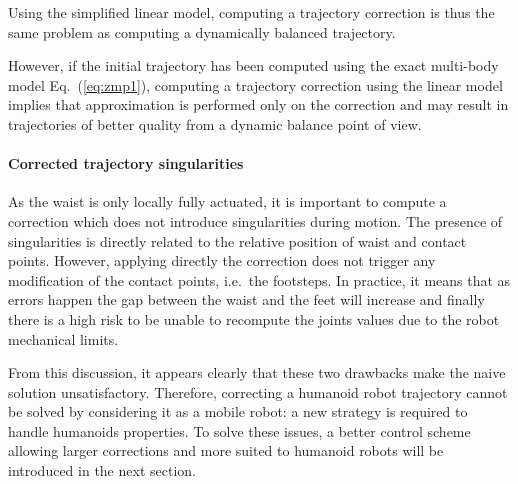 Using the simplified linear model, computing a trajectory correction is thus
the same problem as computing a dynamically balanced trajectory.

However, if the initial trajectory has been computed using the exact
multi-body model Eq.~(\ref{eq:zmp1}), computing a trajectory correction
using the linear model implies that approximation is performed only on
the correction and may result in trajectories of better quality from a
dynamic balance point of view.

\paragraph{Corrected trajectory singularities}
As the waist is only locally fully actuated, it is important to compute
a correction which does not introduce singularities during motion. The
presence of singularities is directly related to the relative position
of waist and contact points. However, applying directly the correction
does not trigger any modification of the contact points, i.e.\ the
footsteps. In practice, it means that as errors happen the gap between
the waist and the feet will increase and finally there is a high risk
to be unable to recompute the joints values due to the robot
mechanical limits.


From this discussion, it appears clearly that these two drawbacks make
the naive solution unsatisfactory. Therefore, correcting a humanoid
robot trajectory cannot be solved by considering it as a mobile robot:
a new strategy is required to handle humanoids properties. To solve
these issues, a better control scheme allowing larger corrections and
more suited to humanoid robots will be introduced in the next section.


\FloatBarrier

